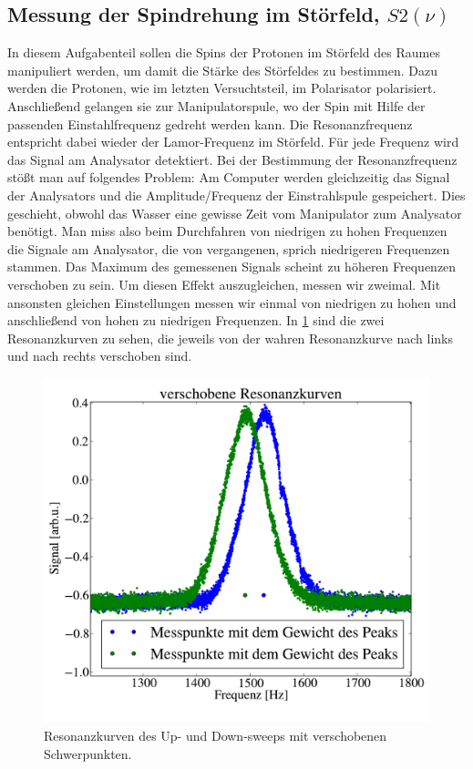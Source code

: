 \documentclass[paper=a4,
	fontsize=10pt,
	DIV=18,
	twocolumn,
	parskip=half
	]{scrartcl}
\numberwithin{equation}{section}    %
\begin{document}
\subsection{Messung der Spindrehung im Störfeld, $S2(\nu)$}
\label{auswertung5}
In diesem Aufgabenteil sollen die Spins der Protonen im Störfeld des Raumes manipuliert werden, um damit die Stärke des Störfeldes zu bestimmen.
Dazu werden die Protonen, wie im letzten Versuchtsteil, im Polarisator polarisiert.
Anschließend gelangen sie zur Manipulatorspule, wo der Spin mit Hilfe der passenden Einstahlfrequenz gedreht werden kann.
Die Resonanzfrequenz entspricht dabei wieder der Lamor-Frequenz im Störfeld.
Für jede Frequenz wird das Signal am Analysator detektiert.
Bei der Bestimmung der Resonanzfrequenz stößt man auf folgendes Problem:
Am Computer werden gleichzeitig das Signal der Analysators und die Amplitude/Frequenz der Einstrahlspule gespeichert.
Dies geschieht, obwohl das Wasser eine gewisse Zeit vom Manipulator zum Analysator benötigt.
Man miss also beim Durchfahren von niedrigen zu hohen Frequenzen die Signale am Analysator, die von vergangenen, sprich niedrigeren Frequenzen stammen.
Das Maximum des gemessenen Signals scheint zu höheren Frequenzen verschoben zu sein.
Um diesen Effekt auszugleichen, messen wir zweimal. 
Mit ansonsten gleichen Einstellungen messen wir einmal von niedrigen zu hohen und anschließend von hohen zu niedrigen Frequenzen.
In \cref{gewichte} sind die zwei Resonanzkurven zu sehen, die jeweils von der wahren Resonanzkurve nach links und nach rechts verschoben sind.
\begin{figure}[htp]
	\begin{center}
		\includegraphics[width=\columnwidth]{Data-Plots/05-Gewichte.pdf}
		\caption{Resonanzkurven des Up- und Down-sweeps mit verschobenen Schwerpunkten.}
		\label{gewichte}
	\end{center}
\end{figure}
\end{document}

